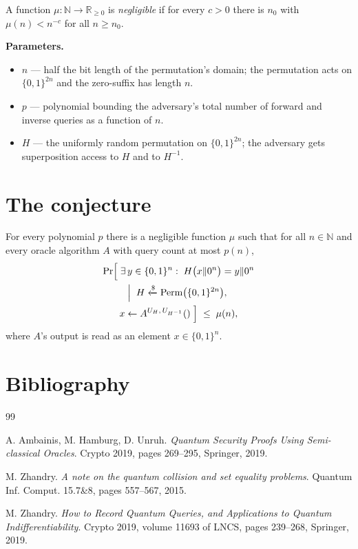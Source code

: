 \documentclass{aicr-conjecture}
\newcommand{\Perm}{\mathrm{Perm}}
\newcommand{\NN}{\mathbb{N}}
\newcommand{\RR}{\mathbb{R}}
\newcommand{\bits}{\{0,1\}}
\begin{document}
A function $\mu : \NN \to \RR_{\ge 0}$ is \emph{negligible} if for
every $c > 0$ there is $n_0$ with $\mu(n) < n^{-c}$ for all
$n \ge n_0$.

\textbf{Parameters.}
\begin{itemize}[leftmargin=1.2em]
\item $n$ --- half the bit length of the permutation's domain; the
  permutation acts on $\bits^{2n}$ and the zero-suffix has length $n$.
\item $p$ --- polynomial bounding the adversary's total number of
  forward and inverse queries as a function of $n$.
\item $H$ --- the uniformly random permutation on $\bits^{2n}$; the
  adversary gets superposition access to $H$ and to $H^{-1}$.
\end{itemize}

\section{The conjecture}\label{sec:conjectures}

\begin{conjecture}
\label{conj:main}
For every polynomial $p$ there is a negligible function $\mu$ such
that for all $n \in \NN$ and every oracle algorithm $A$ with query
count at most $p(n)$,
\begin{multline*}
  \Pr\Bigl[\; \exists\, y \in \bits^n :\;
    H\bigl(x \| 0^n\bigr) = y \| 0^n \\
  \Bigm|\; H \xleftarrow{\$} \Perm\bigl(\bits^{2n}\bigr),\; \\
    x \leftarrow A^{U_H,\, U_{H^{-1}}}() \;\Bigr]
  \;\le\; \mu(n),
\end{multline*}
where $A$'s output is read as an element $x \in \bits^n$.
\end{conjecture}

\section{Bibliography}

\begin{aicrbibliography}{99}

A. Ambainis, M. Hamburg, D. Unruh.
\emph{Quantum Security Proofs Using Semi-classical Oracles}.
Crypto 2019, pages 269--295, Springer, 2019.

M. Zhandry.
\emph{A note on the quantum collision and set equality problems}.
Quantum Inf. Comput. 15.7\&8, pages 557--567, 2015.

M. Zhandry.
\emph{How to Record Quantum Queries, and Applications to Quantum
Indifferentiability}.
Crypto 2019, volume 11693 of LNCS, pages 239--268, Springer, 2019.

\end{aicrbibliography}
\end{document}
